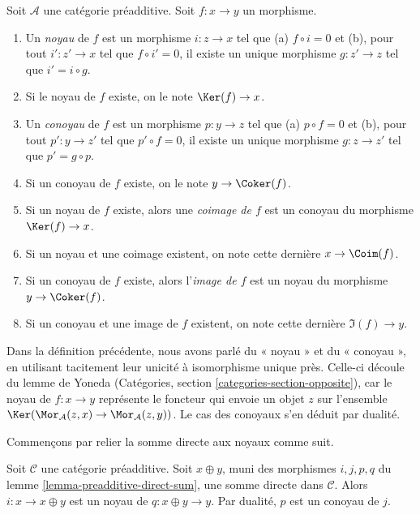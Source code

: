 \begin{definition}
\label{definition-kernel}
Soit $\mathcal{A}$ une catégorie préadditive.
Soit $f : x \to y$ un morphisme.
\begin{enumerate}
\item Un {\it noyau} de $f$ est un morphisme
$i : z \to x$ tel que (a) $f \circ i = 0$ et (b),
pour tout $i' : z' \to x$ tel que $f \circ i' = 0$, il
existe un unique morphisme $g : z' \to z$ tel que
$i' = i \circ g$.
\item Si le noyau de $f$ existe, on le note
$\Ker(f) \to x$.
\item Un {\it conoyau} de $f$ est un morphisme
$p : y \to z$ tel que (a) $p \circ f = 0$ et (b),
pour tout $p' : y \to z'$ tel que $p' \circ f = 0$, il
existe un unique morphisme $g : z \to z'$ tel que
$p' = g \circ p$.
\item Si un conoyau de $f$ existe, on le note
$y \to \Coker(f)$.
\item Si un noyau de $f$ existe, alors une {\it coimage
de $f$} est un conoyau du morphisme $\Ker(f) \to x$.
\item Si un noyau et une coimage existent, on note cette dernière
$x \to \Coim(f)$.
\item Si un conoyau de $f$ existe, alors l'{\it image de
$f$} est un noyau du morphisme $y \to \Coker(f)$.
\item Si un conoyau et une image de $f$ existent, on note cette dernière
$\Im(f) \to y$.
\end{enumerate}
\end{definition}

\noindent
Dans la définition précédente, nous avons parlé du « noyau » et du
« conoyau », en utilisant tacitement leur unicité
à isomorphisme unique près. Celle-ci découle du lemme de Yoneda
(Catégories, section \ref{categories-section-opposite}),
car le noyau de $f : x \to y$ représente le foncteur qui
envoie un objet $z$ sur l'ensemble
$\Ker(\Mor_\mathcal{A}(z, x) \to \Mor_\mathcal{A}(z, y))$.
Le cas des conoyaux s'en déduit par dualité.

\medskip\noindent
Commençons par relier la somme directe aux noyaux comme suit.

\begin{lemma}
\label{lemma-additive-cat-biproduct-kernel}
Soit $\mathcal{C}$ une catégorie préadditive.
Soit $x \oplus y$, muni des morphismes $i, j, p, q$ du
lemme \ref{lemma-preadditive-direct-sum},
une somme directe dans $\mathcal{C}$. Alors $i : x \to x \oplus y$
est un noyau de $q : x \oplus y \rightarrow y$. Par dualité, $p$ est
un conoyau de $j$.
\end{lemma}

